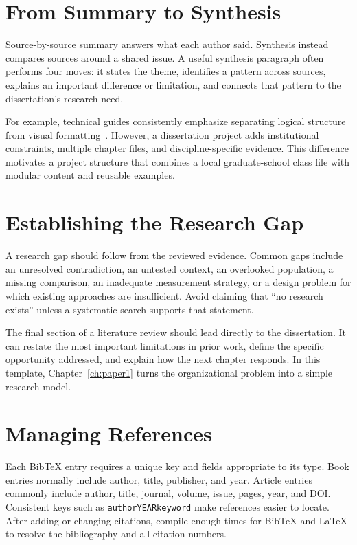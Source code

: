 \section{From Summary to Synthesis}

Source-by-source summary answers what each author said. Synthesis instead compares sources around a shared issue. A useful synthesis paragraph often performs four moves: it states the theme, identifies a pattern across sources, explains an important difference or limitation, and connects that pattern to the dissertation's research need.

For example, technical guides consistently emphasize separating logical structure from visual formatting~\cite{knuth1984texbook,lamport1994latex}. However, a dissertation project adds institutional constraints, multiple chapter files, and discipline-specific evidence. This difference motivates a project structure that combines a local graduate-school class file with modular content and reusable examples.

\section{Establishing the Research Gap}

A research gap should follow from the reviewed evidence. Common gaps include an unresolved contradiction, an untested context, an overlooked population, a missing comparison, an inadequate measurement strategy, or a design problem for which existing approaches are insufficient. Avoid claiming that ``no research exists'' unless a systematic search supports that statement.

The final section of a literature review should lead directly to the dissertation. It can restate the most important limitations in prior work, define the specific opportunity addressed, and explain how the next chapter responds. In this template, Chapter~\ref{ch:paper1} turns the organizational problem into a simple research model.

\section{Managing References}

Each BibTeX entry requires a unique key and fields appropriate to its type. Book entries normally include author, title, publisher, and year. Article entries commonly include author, title, journal, volume, issue, pages, year, and DOI. Consistent keys such as \texttt{authorYEARkeyword} make references easier to locate. After adding or changing citations, compile enough times for BibTeX and LaTeX to resolve the bibliography and all citation numbers.
